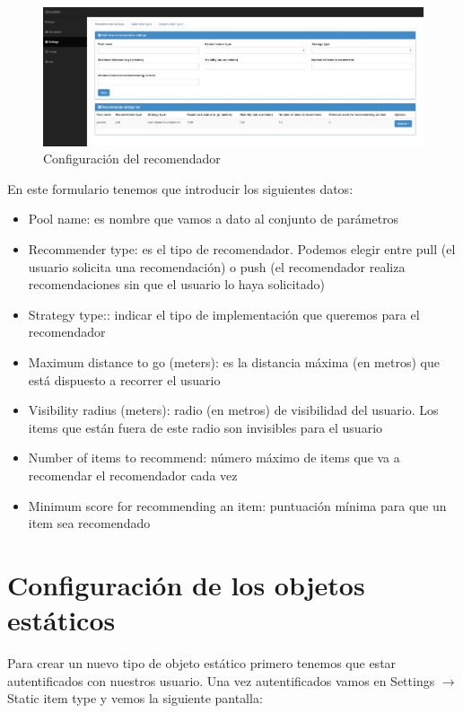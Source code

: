 \begin{figure}[H]
	\centering\includegraphics[scale=0.3]{imagenes/capitulo2/configuracion-recomendador.jpg}
	\caption{Configuración del recomendador}
	\label{img:ConfiguracionRecomendador}
\end{figure}

\newpage

En este formulario tenemos que introducir los siguientes datos:
\begin{itemize}
	\item Pool name: es nombre que vamos a dato al conjunto de parámetros
	\item Recommender type: es el tipo de recomendador. Podemos elegir entre pull (el usuario solicita una recomendación) o push (el recomendador realiza recomendaciones sin que el usuario lo haya solicitado)
	\item Strategy type:: indicar el tipo de implementación que queremos para el recomendador
	\item Maximum distance to go (meters): es la distancia máxima (en metros) que está dispuesto a recorrer el usuario
	\item Visibility radius (meters): radio (en metros) de visibilidad del usuario. Los items que están fuera de este radio son invisibles para el usuario 
	\item Number of items to recommend: número máximo de items que va a recomendar el recomendador cada vez
	\item Minimum score for recommending an item: puntuación mínima para que un item sea recomendado
\end{itemize}

\section{Configuración de los objetos estáticos}\label{sec:confObjEstaticos}

Para crear un nuevo tipo de objeto estático primero tenemos que estar autentificados con nuestros usuario. Una vez autentificados vamos en Settings $\rightarrow$ Static item type y vemos la siguiente pantalla:

